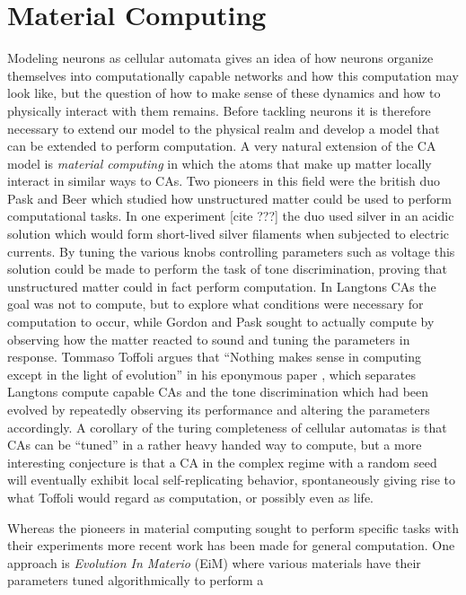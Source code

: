 \section{Material Computing}
Modeling neurons as cellular automata gives an idea of how neurons organize
themselves into computationally capable networks and how this computation may
look like, but the question of how to make sense of these dynamics and how to
physically interact with them remains.
Before tackling neurons it is therefore necessary to extend our model to the physical
realm and develop a model that can be extended to perform computation.
A very natural extension of the CA model is \emph{material computing} in which
the atoms that make up matter locally interact in similar ways to CAs.
%
Two pioneers in this field were the british duo Pask and Beer which studied how
unstructured matter could be used to perform computational tasks.
%
In one experiment [cite ???] the duo used silver in an acidic solution which
would form short-lived silver filaments when subjected to electric currents.
%
By tuning the various knobs controlling parameters such as voltage this solution
could be made to perform the task of tone discrimination, proving that
unstructured matter could in fact perform computation.
%
In Langtons CAs the goal was not to compute, but to explore what conditions were
necessary for computation to occur, while Gordon and Pask sought to actually
compute by observing how the matter reacted to sound and tuning the parameters
in response.
%
Tommaso Toffoli argues that ``Nothing makes sense in computing except in the
light of evolution'' in his eponymous paper
\cite{tommaso_toffoli_nothing_nodate}, which separates Langtons compute capable
CAs and the tone discrimination which had been evolved by repeatedly observing
its performance and altering the parameters accordingly.
%
A corollary of the turing completeness of cellular automatas is that CAs can be
``tuned'' in a rather heavy handed way to compute, but a more interesting
conjecture is that a CA in the complex regime with a random seed will eventually
exhibit local self-replicating behavior, spontaneously giving rise to what
Toffoli would regard as computation, or possibly even as life.\par
%
Whereas the pioneers in material computing sought to perform specific tasks with
their experiments more recent work has been made for general computation. One
approach is \emph{Evolution In Materio} (EiM) \cite{tufteEiMpaper} where various
materials have their parameters tuned algorithmically to perform a
